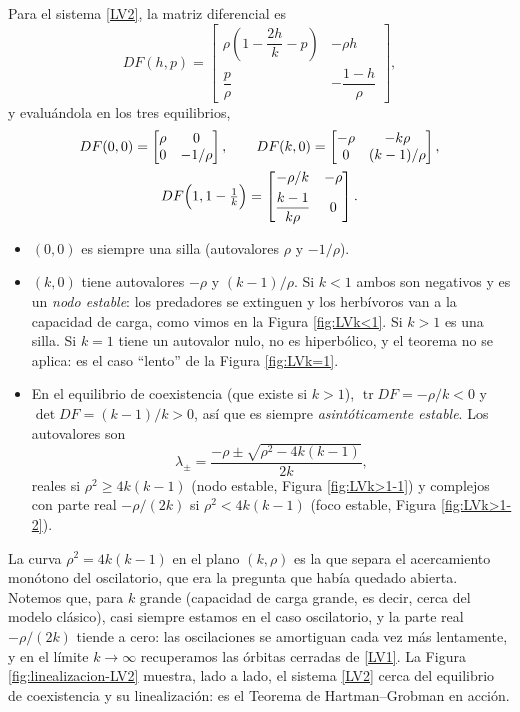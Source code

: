 \documentclass[12pt, a4paper]{amsbook}
\newcommand{\tr}{\operatorname{tr}}
\theoremstyle{remark}
\theoremstyle{definition}
\numberwithin{section}{chapter}
\numberwithin{subsection}{section}
\numberwithin{equation}{section}
\numberwithin{figure}{chapter}
\begin{document}
Para el sistema \eqref{LV2}, la matriz diferencial es
$$
DF(h,p) =
\begin{bmatrix}
\rho\left(1-\dfrac{2h}{k}-p\right) & -\rho h\\[6pt]
\dfrac{p}{\rho} & -\dfrac{1-h}{\rho}
\end{bmatrix},
$$
y evaluándola en los tres equilibrios,
\begin{gather*}
DF(0,0)=\begin{bmatrix} \rho & 0\\ 0 & -1/\rho\end{bmatrix},\qquad
DF(k,0)=\begin{bmatrix} -\rho & -k\rho\\ 0 & (k-1)/\rho\end{bmatrix},\\
DF\Bigl(1,1-\tfrac1k\Bigr)=\begin{bmatrix} -\rho/k & -\rho\\[4pt] \dfrac{k-1}{k\rho} & 0\end{bmatrix}.
\end{gather*}
\begin{itemize}
\item $(0,0)$ es siempre una silla (autovalores $\rho$ y $-1/\rho$).
\item $(k,0)$ tiene autovalores $-\rho$ y $(k-1)/\rho$. Si $k<1$ ambos son negativos y es un \emph{nodo estable}: los predadores se extinguen y los herbívoros van a la capacidad de carga, como vimos en la Figura \ref{fig:LVk<1}. Si $k>1$ es una silla. Si $k=1$ tiene un autovalor nulo, no es hiperbólico, y el teorema no se aplica: es el caso ``lento'' de la Figura \ref{fig:LVk=1}.
\item En el equilibrio de coexistencia (que existe si $k>1$), $\tr DF = -\rho/k<0$ y $\det DF = (k-1)/k>0$, así que es siempre \emph{asintóticamente estable}. Los autovalores son
$$
\lambda_\pm = \frac{-\rho\pm\sqrt{\rho^2-4k(k-1)}}{2k},
$$
reales si $\rho^2\ge 4k(k-1)$ (nodo estable, Figura \ref{fig:LVk>1-1}) y complejos con parte real $-\rho/(2k)$ si $\rho^2<4k(k-1)$ (foco estable, Figura \ref{fig:LVk>1-2}).
\end{itemize}
La curva $\rho^2 = 4k(k-1)$ en el plano $(k,\rho)$ es la que separa el acercamiento monótono del oscilatorio, que era la pregunta que había quedado abierta. Notemos que, para $k$ grande (capacidad de carga grande, es decir, cerca del modelo clásico), casi siempre estamos en el caso oscilatorio, y la parte real $-\rho/(2k)$ tiende a cero: las oscilaciones se amortiguan cada vez más lentamente, y en el límite $k\to\infty$ recuperamos las órbitas cerradas de \eqref{LV1}. La Figura \ref{fig:linealizacion-LV2} muestra, lado a lado, el sistema \eqref{LV2} cerca del equilibrio de coexistencia y su linealización: es el Teorema de Hartman--Grobman en acción.
\end{document}
